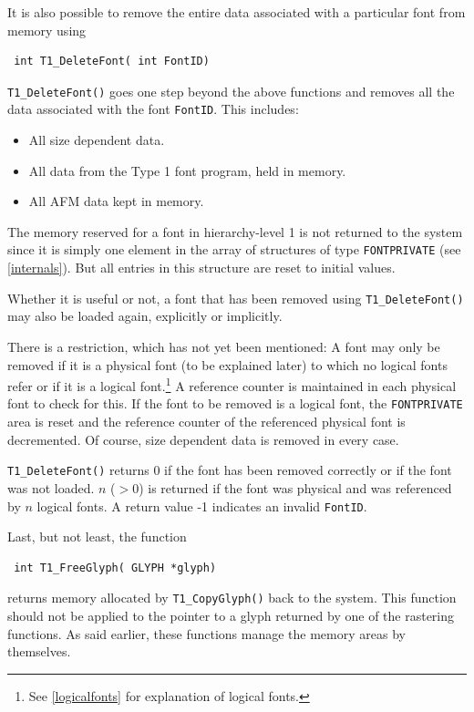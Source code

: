 It is also possible to remove the entire data  associated with a
particular font from memory using
\precorr
\begin{verbatim}
 int T1_DeleteFont( int FontID)
\end{verbatim}\postcorr
\verb+T1_DeleteFont()+ goes one step beyond the above functions and
removes all the data associated with the font \verb+FontID+. This
includes:
\begin{itemize}
\item All size dependent data.
\item All data from the Type 1 font program, held in memory.
\item All AFM data kept in memory. 
\end{itemize}
The memory reserved for a font in hierarchy-level 1 is not returned to
the system since it is simply one element in the array of structures of
type \verb+FONTPRIVATE+ (see \ref{internals}). But all entries in this
structure are reset to initial values.

Whether it is useful or not, a font that has been removed using
\verb+T1_DeleteFont()+ may also be loaded again, explicitly or
implicitly.

There is a restriction, which has not yet been mentioned: A font may only be
removed if it is a physical font (to be explained later) to which no logical
fonts refer or if it is a logical font.\footnote{See \ref{logicalfonts} for
  explanation of logical fonts.} A reference counter is maintained in each
physical font to check for this. If the font to be removed is a logical font,
the \verb+FONTPRIVATE+ area is reset and the reference counter of the
referenced physical font is decremented. Of course, size dependent data is
removed in every case.

\verb+T1_DeleteFont()+ returns 0 if the font has been removed correctly or if
the font was not loaded. $n$ ($>0$) is returned if
the font was physical and was referenced by $n$ logical fonts. A
return value -1 indicates an invalid \verb+FontID+.

Last, but not least, the function 
\precorr
\begin{verbatim}
 int T1_FreeGlyph( GLYPH *glyph)
\end{verbatim}\postcorr
returns memory allocated by
\verb+T1_CopyGlyph()+ back to the system. This function should not be
applied to the pointer to a glyph returned by one of the rastering
functions. As said earlier, these functions manage the memory areas by
themselves. 

